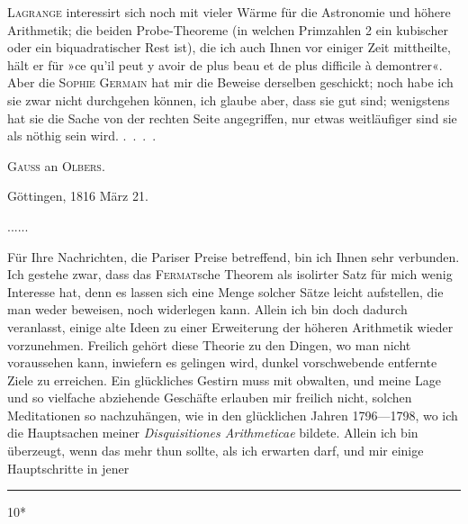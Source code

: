 \textsc{Lagrange} interessirt sich noch mit vieler Wärme für die Astronomie
und höhere Arithmetik; die beiden Probe-Theoreme (in welchen Primzahlen
2 ein kubischer oder ein biquadratischer Rest ist), die ich auch Ihnen vor
einiger Zeit mittheilte, hält er für »ce qu’il peut y avoir de plus beau et de
plus difficile à demontrer«. Aber die \textsc{Sophie Germain} hat mir die Beweise
derselben geschickt; noch habe ich sie zwar nicht durchgehen können, ich
glaube aber, dass sie gut sind; wenigstens hat sie die Sache von der rechten
Seite angegriffen, nur etwas weitläufiger sind sie als nöthig sein wird. .\ .\ .\ .
\ClosingRule
\begin{center}\large\textsc{Gauss} an \textsc{Olbers}.\end{center}
\begin{flushright}Göttingen, 1816 März 21.\end{flushright}
\noindent .\quad .\quad .\quad .\quad .\quad .\par
\par\indent Für Ihre Nachrichten, die Pariser Preise betreffend, bin ich Ihnen sehr
verbunden. Ich gestehe zwar, dass das \textsc{Fermat}sche Theorem als isolirter
Satz für mich wenig Interesse hat, denn es lassen sich eine Menge solcher
Sätze leicht aufstellen, die man weder beweisen, noch widerlegen kann. Allein
ich bin doch dadurch veranlasst, einige alte Ideen zu einer  Erweiterung
der höheren Arithmetik wieder vorzunehmen. Freilich gehört diese
Theorie zu den Dingen, wo man nicht voraussehen kann, inwiefern es gelingen
wird, dunkel vorschwebende entfernte Ziele zu erreichen. Ein glückliches
Gestirn muss mit obwalten, und meine Lage und so vielfache abziehende
Geschäfte erlauben mir freilich nicht, solchen Meditationen so nachzuhängen,
wie in den glücklichen Jahren 1796—1798, wo ich die Hauptsachen meiner
\textit{Disquisitiones Arithmeticae} bildete. Allein ich bin überzeugt, wenn das 
mehr thun sollte, als ich erwarten darf, und mir einige Hauptschritte in jener
\par\vfill\noindent\rule{.25\linewidth}{.4pt}\par\smallskip
\begingroup\footnotesize
{}\par
\endgroup
\noindent\hfill10*\par\clearpage
{}
